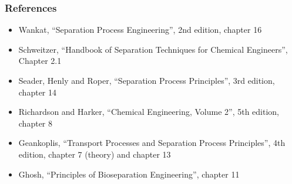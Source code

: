 \begin{frame}\frametitle{References}
	\begin{itemize}
		\item	Wankat, ``Separation Process Engineering'', 2nd edition, chapter 16
		\item	Schweitzer, ``Handbook of Separation Techniques for Chemical Engineers'', Chapter 2.1
		\item	Seader, Henly and Roper, ``Separation Process Principles'', 3rd edition, chapter 14
		\item	Richardson and Harker, ``Chemical Engineering, Volume 2'', 5th edition, chapter 8
		\item	Geankoplis, ``Transport Processes and Separation Process Principles'', 4th edition, chapter 7 (theory) and chapter 13
		\item	Ghosh, ``Principles of Bioseparation Engineering'', chapter 11
	\end{itemize}
\end{frame}

